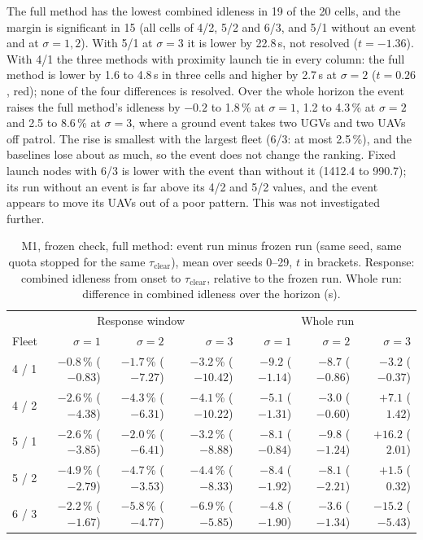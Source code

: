 \documentclass[11pt]{article}
\theoremstyle{definition}
\theoremstyle{plain}
\begin{document}
The full method has the lowest combined idleness in 19 of the 20 cells, and
the margin is significant in 15 (all cells of 4/2, 5/2 and 6/3, and 5/1
without an event and at $\sigma = 1, 2$). With 5/1 at $\sigma = 3$ it is
lower by 22.8\,s, not resolved ($t = -1.36$). With 4/1 the three methods
with proximity launch tie in every column: the full method is lower by 1.6
to 4.8\,s in three cells and higher by 2.7\,s at $\sigma = 2$ ($t = 0.26$,
red); none of the four differences is resolved. Over the whole horizon the
event raises the full method's idleness by $-0.2$ to 1.8\,\% at
$\sigma = 1$, 1.2 to 4.3\,\% at $\sigma = 2$ and 2.5 to 8.6\,\% at
$\sigma = 3$, where a ground event takes two UGVs and two UAVs off patrol.
The rise is smallest with the largest fleet (6/3: at most 2.5\,\%), and the
baselines lose about as much, so the event does not change the ranking.
Fixed launch nodes with 6/3 is lower with the event than without it
(1412.4 to 990.7); its run without an event is far above its 4/2 and 5/2
values, and the event appears to move its UAVs out of a poor pattern. This
was not investigated further.

\begin{table}[H]
\centering
\small
\caption{M1, frozen check, full method: event run minus frozen run (same seed, same quota stopped for the same $\tau_{\mathrm{clear}}$), mean over seeds 0--29, $t$ in brackets. Response: combined idleness from onset to $\tau_{\mathrm{clear}}$, relative to the frozen run. Whole run: difference in combined idleness over the horizon (s).}
\label{tab:m1frozen}
\setlength{\tabcolsep}{3pt}
\begin{tabular}{lrrrrrr}
\toprule
& \multicolumn{3}{c}{Response window} & \multicolumn{3}{c}{Whole run} \\
Fleet & $\sigma = 1$ & $\sigma = 2$ & $\sigma = 3$ & $\sigma = 1$ & $\sigma = 2$ & $\sigma = 3$ \\
\midrule
4 / 1 & $-0.8$\,\% ($-0.83$) & $-1.7$\,\% ($-7.27$) & $-3.2$\,\% ($-10.42$) & $-9.2$ ($-1.14$) & $-8.7$ ($-0.86$) & $-3.2$ ($-0.37$) \\
4 / 2 & $-2.6$\,\% ($-4.38$) & $-4.3$\,\% ($-6.31$) & $-4.1$\,\% ($-10.22$) & $-5.1$ ($-1.31$) & $-3.0$ ($-0.60$) & $+7.1$ ($1.42$) \\
5 / 1 & $-2.6$\,\% ($-3.85$) & $-2.0$\,\% ($-6.41$) & $-3.2$\,\% ($-8.88$) & $-8.1$ ($-0.84$) & $-9.8$ ($-1.24$) & $+16.2$ ($2.01$) \\
5 / 2 & $-4.9$\,\% ($-2.79$) & $-4.7$\,\% ($-3.53$) & $-4.4$\,\% ($-8.33$) & $-8.4$ ($-1.92$) & $-8.1$ ($-2.21$) & $+1.5$ ($0.32$) \\
6 / 3 & $-2.2$\,\% ($-1.67$) & $-5.8$\,\% ($-4.77$) & $-6.9$\,\% ($-5.85$) & $-4.8$ ($-1.90$) & $-3.6$ ($-1.34$) & $-15.2$ ($-5.43$) \\
\bottomrule
\end{tabular}
\end{table}
\end{document}
